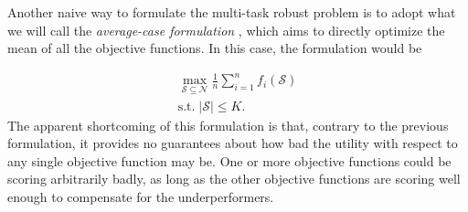 \documentclass[letter,11pt]{article}
\def\sS{\mathcal{S}}
\def\sN{\mathcal{N}}
\begin{document}
Another naive way to formulate the multi-task robust problem is to adopt what we will call the \textit{average-case formulation} \cite{malherbe2022robustness, pmlr-v89-staib19a}, which aims to directly optimize the mean of all the objective functions. In this case, the formulation would be

\begin{equation}
\begin{gathered}
\max_{\sS \subseteq \sN} \frac{1}{n}\sum_{i=1}^n f_i(\sS) \label{robust-avg}\\
\text{s.t.}\;\lvert \sS\rvert \leq K.
\end{gathered}
\end{equation}
The apparent shortcoming of this formulation is that, contrary to the previous formulation, it provides no guarantees about how bad the utility with respect to any single objective function may be. One or more objective functions could be scoring arbitrarily badly, as long as the other objective functions are scoring well enough to compensate for the underperformers. 
\end{document}
